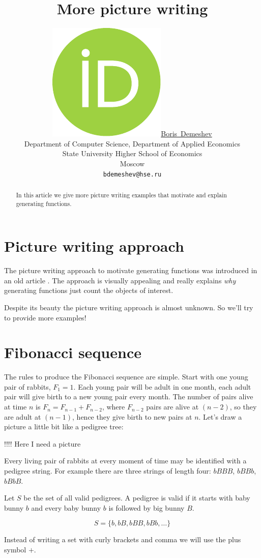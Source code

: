 \documentclass{article}
\title{More picture writing}
\author{ \href{https://orcid.org/0000-0003-2284-3204}{\includegraphics[scale=0.06]{orcid.pdf}\hspace{1mm}Boris~Demeshev}\\ %
	Department of Computer Science, Department of Applied Economics\\
	State University Higher School of Economics\\
	Moscow \\
	\texttt{bdemeshev@hse.ru} \\
}
\newcommand{\bigb}{B}
\newcommand{\babyb}{b}
\begin{document}
\maketitle

\begin{abstract}
	In this article we give more picture writing examples that motivate and explain generating functions. 
\end{abstract}


\section{Picture writing approach}

The picture writing approach to motivate generating functions was introduced in an old article \cite{polya1956picture}.
The approach is visually appealing and really explains \textit{why} generating functions just count the objects of interest.

Despite its beauty the picture writing approach is almost unknown. So we'll try to provide more examples!


\section{Fibonacci sequence}


The rules to produce the Fibonacci sequence are simple. 
Start with one young pair of rabbits, $F_1 = 1$. 
Each young pair will be adult in one month, each adult pair will give birth to a new young pair every month. 
The number of pairs alive at time $n$ is $F_n = F_{n-1} + F_{n-2}$, 
where $F_{n-2}$ pairs are alive at $(n-2)$, so they are 
adult at $(n-1)$, hence they give birth to new pairs at $n$. 
Let's draw a picture a little bit like a pedigree tree:


!!!! Here I need a picture

Every living pair of rabbits at every moment of time may be identified with a pedigree string.
For example there are three strings of length four: $\babyb\bigb\bigb\bigb$, 
$\babyb\bigb\bigb\babyb$, $\babyb\bigb\babyb\bigb$.

Let $S$ be the set of all valid pedigrees. 
A pedigree is valid if it starts with baby bunny $\babyb$ and every baby bunny $\babyb$ is followed by big bunny $\bigb$. 

\[
S = \{ \babyb, \babyb\bigb, \babyb\bigb\bigb, \babyb\bigb\babyb, \ldots \} 	
\]

Instead of writing a set with curly brackets and comma we will use the plus symbol $+$.
\end{document}
